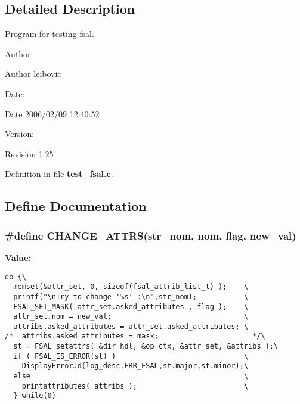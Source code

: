 \subsection{Detailed Description}
Program for testing fsal. 

\begin{Desc}
\item[Author:]\begin{Desc}
\item[Author]leibovic \end{Desc}
\end{Desc}
\begin{Desc}
\item[Date:]\begin{Desc}
\item[Date]2006/02/09 12:40:52 \end{Desc}
\end{Desc}
\begin{Desc}
\item[Version:]\begin{Desc}
\item[Revision]1.25 \end{Desc}
\end{Desc}


Definition in file {\bf test\_\-fsal.c}.

\subsection{Define Documentation}
\subsubsection{\setlength{\rightskip}{0pt plus 5cm}\#define CHANGE\_\-ATTRS(str\_\-nom, nom, flag, new\_\-val)}\label{test__fsal_8c_a1}


{\bf Value:}

\footnotesize\begin{verbatim}do {\
  memset(&attr_set, 0, sizeof(fsal_attrib_list_t) );    \
  printf("\nTry to change '%s' :\n",str_nom);           \
  FSAL_SET_MASK( attr_set.asked_attributes , flag );    \
  attr_set.nom = new_val;                               \
  attribs.asked_attributes = attr_set.asked_attributes; \
/*  attribs.asked_attributes = mask;                      */\
  st = FSAL_setattrs( &dir_hdl, &op_ctx, &attr_set, &attribs );\
  if ( FSAL_IS_ERROR(st) )                              \
    DisplayErrorJd(log_desc,ERR_FSAL,st.major,st.minor);\
  else                                                  \
    printattributes( attribs );                         \
  } while(0)
\end{verbatim}\normalsize 
